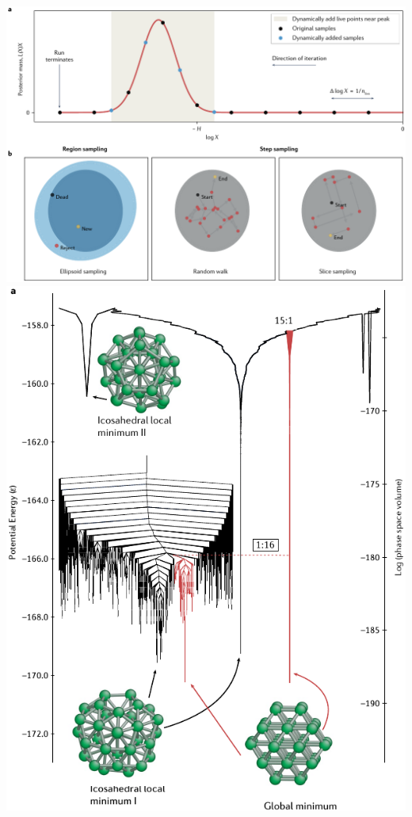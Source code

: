 \documentclass[aspectratio=169]{beamer}
\begin{document}
\begin{frame}
\begin{columns}
        \includegraphics[width=\textwidth]{figures/nature2}
        \includegraphics[width=\textwidth]{figures/nature4}

\end{columns}
\end{frame}
\end{document}

